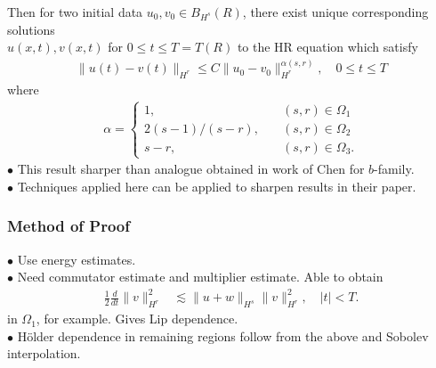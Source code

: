 \documentclass{beamer}
\begin{document}
\begin{frame}
%
Then for two initial data $u_{0}, v_{0} \in B_{H^{s}}(R)$, there exist unique
corresponding solutions \\ $u(x,t), v(x,t)$ for $0 \le t \le T= T(R)$ to the
HR equation which satisfy 
%
%
\begin{equation*}
\begin{split}
\| u(t) - v(t) \|_{H^{r}} \le C \| u_{0} - v_{0} \|_{H^{r}}^{\alpha(s, r)},
\quad 0
\le t \le T
\end{split}
\end{equation*}
%
%
where 
%
%
\begin{equation*}
\begin{split}
\alpha = 
\begin{cases}
1, \quad & (s,r) \in \Omega_{1} 
\\
2(s-1)/(s-r),  \quad & (s, r) \in \Omega_{2}
\\
s-r, \quad & (s, r) \in \Omega_{3}.
\end{cases}
\end{split}
\end{equation*}
%
%
%
%
%
%
%
%
\pause
$\bullet$ This result sharper than analogue obtained in
work of Chen for $b$-family. 
\\
$\bullet$ Techniques applied here can be applied to sharpen results in their paper. 
\end{frame}
\begin{frame}
  \frametitle{Method of Proof}
 $\bullet$ Use energy estimates. 
 \\
 $\bullet$
 Need commutator estimate and multiplier estimate. Able to obtain
\begin{equation*}
\begin{split}
\frac{1}{2} \frac{d}{dt}
\|v\|_{H^r}^2
& \lesssim \|u+w\|_{H^s}
\|v\|_{H^r}^2, \quad | t | < T.
\label{9v-iu}
\end{split}
\end{equation*}
in $\Omega_{1}$, for example. Gives Lip dependence.
\\
$\bullet$
H\"older dependence in remaining regions follow from the above and Sobolev interpolation.
\end{frame}
\end{document}
